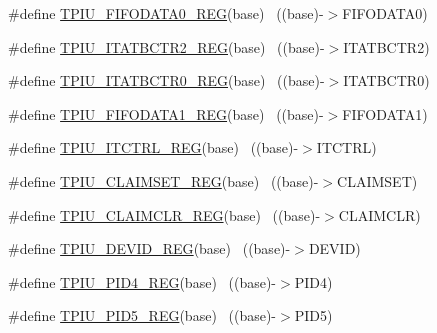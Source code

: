 \begin{DoxyCompactItemize}
\item 
\#define \hyperlink{group___t_p_i_u___register___accessor___macros_ga594012ee05bd16f52ef3428367d9aa09}{T\+P\+I\+U\+\_\+\+F\+I\+F\+O\+D\+A\+T\+A0\+\_\+\+R\+EG}(base)                              ~((base)-\/$>$F\+I\+F\+O\+D\+A\+T\+A0)
\item 
\#define \hyperlink{group___t_p_i_u___register___accessor___macros_ga99561f9638b22afba7974e22aa56d93d}{T\+P\+I\+U\+\_\+\+I\+T\+A\+T\+B\+C\+T\+R2\+\_\+\+R\+EG}(base)                              ~((base)-\/$>$I\+T\+A\+T\+B\+C\+T\+R2)
\item 
\#define \hyperlink{group___t_p_i_u___register___accessor___macros_gaebf01febdbeec8c142c03b5c074e1fed}{T\+P\+I\+U\+\_\+\+I\+T\+A\+T\+B\+C\+T\+R0\+\_\+\+R\+EG}(base)                              ~((base)-\/$>$I\+T\+A\+T\+B\+C\+T\+R0)
\item 
\#define \hyperlink{group___t_p_i_u___register___accessor___macros_ga94e7646ffbef879b19b84538655f8661}{T\+P\+I\+U\+\_\+\+F\+I\+F\+O\+D\+A\+T\+A1\+\_\+\+R\+EG}(base)                              ~((base)-\/$>$F\+I\+F\+O\+D\+A\+T\+A1)
\item 
\#define \hyperlink{group___t_p_i_u___register___accessor___macros_ga3fb80a5db7419d9b28f36030fa56c9f6}{T\+P\+I\+U\+\_\+\+I\+T\+C\+T\+R\+L\+\_\+\+R\+EG}(base)                                    ~((base)-\/$>$I\+T\+C\+T\+RL)
\item 
\#define \hyperlink{group___t_p_i_u___register___accessor___macros_ga36e2ff51a935b49ba3848abac32d9771}{T\+P\+I\+U\+\_\+\+C\+L\+A\+I\+M\+S\+E\+T\+\_\+\+R\+EG}(base)                                ~((base)-\/$>$C\+L\+A\+I\+M\+S\+ET)
\item 
\#define \hyperlink{group___t_p_i_u___register___accessor___macros_ga0e17510140274c78c7590de1b5d39c75}{T\+P\+I\+U\+\_\+\+C\+L\+A\+I\+M\+C\+L\+R\+\_\+\+R\+EG}(base)                                ~((base)-\/$>$C\+L\+A\+I\+M\+C\+LR)
\item 
\#define \hyperlink{group___t_p_i_u___register___accessor___macros_ga30d4f93f5e89c158bb79417caf4daa37}{T\+P\+I\+U\+\_\+\+D\+E\+V\+I\+D\+\_\+\+R\+EG}(base)                                      ~((base)-\/$>$D\+E\+V\+ID)
\item 
\#define \hyperlink{group___t_p_i_u___register___accessor___macros_ga2fb69dcf92ae17576611bbaef82a311b}{T\+P\+I\+U\+\_\+\+P\+I\+D4\+\_\+\+R\+EG}(base)                                        ~((base)-\/$>$P\+I\+D4)
\item 
\#define \hyperlink{group___t_p_i_u___register___accessor___macros_ga23bae8088e08814bfd85ca65917ef08d}{T\+P\+I\+U\+\_\+\+P\+I\+D5\+\_\+\+R\+EG}(base)                                        ~((base)-\/$>$P\+I\+D5)

\end{DoxyCompactItemize}

